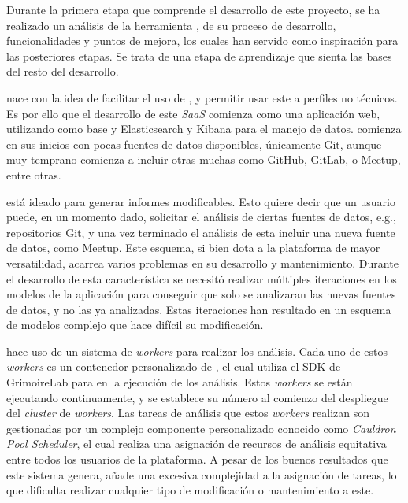 Durante la primera etapa que comprende el desarrollo de este proyecto, se ha realizado un análisis de la herramienta , de su proceso de desarrollo, funcionalidades y puntos de mejora, los cuales han servido como inspiración para las posteriores etapas. Se trata de una etapa de aprendizaje que sienta las bases del resto del desarrollo.

 nace con la idea de facilitar el uso de , y permitir usar este a perfiles no técnicos. Es por ello que el desarrollo de este \emph{SaaS} comienza como una aplicación web, utilizando  como base y Elasticsearch y Kibana para el manejo de datos.  comienza en sus inicios con pocas fuentes de datos disponibles, únicamente Git, aunque muy temprano comienza a incluir otras muchas como GitHub, GitLab, o Meetup, entre otras.

 está ideado para generar informes modificables. Esto quiere decir que un usuario puede, en un momento dado, solicitar el análisis de ciertas fuentes de datos, e.g., repositorios Git, y una vez terminado el análisis de esta incluir una nueva fuente de datos, como Meetup. Este esquema, si bien dota a la plataforma de mayor versatilidad, acarrea varios problemas en su desarrollo y mantenimiento. Durante el desarrollo de esta característica se necesitó realizar múltiples iteraciones en los modelos de la aplicación para conseguir que solo se analizaran las nuevas fuentes de datos, y no las ya analizadas. Estas iteraciones han resultado en un esquema de modelos complejo que hace difícil su modificación.

 hace uso de un sistema de \emph{workers} para realizar los análisis. Cada uno de estos \emph{workers} es un contenedor personalizado de , el cual utiliza el SDK de GrimoireLab para  en la ejecución de los análisis. Estos \emph{workers} se están ejecutando continuamente, y se establece su número al comienzo del despliegue del \emph{cluster} de \emph{workers}. Las tareas de análisis que estos \emph{workers} realizan son gestionadas por un complejo componente personalizado conocido como \emph{Cauldron Pool Scheduler}, el cual realiza una asignación de recursos de análisis equitativa entre todos los usuarios de la plataforma. A pesar de los buenos resultados que este sistema genera, añade una excesiva complejidad a la asignación de tareas, lo que dificulta realizar cualquier tipo de modificación o mantenimiento a este.

